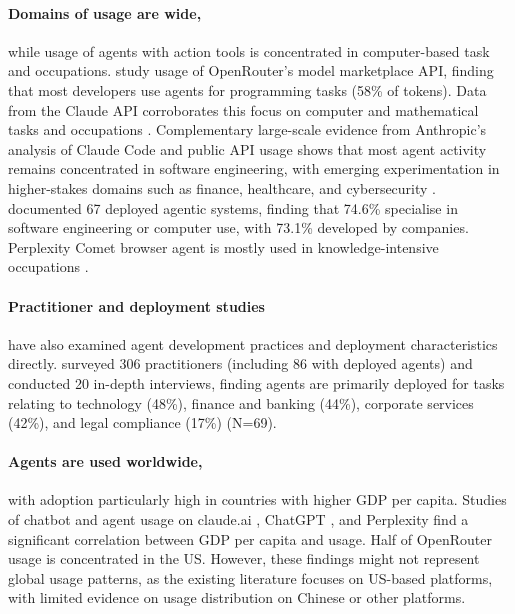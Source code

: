 \documentclass[manuscript,screen,nonacm,oneside]{acmart}
\begin{document}
\paragraph{Domains of usage are wide,} while usage of agents with action tools is concentrated in computer-based task and occupations. \citep{aubakirova2025state} study usage of OpenRouter's model marketplace API, finding that most developers use agents for programming tasks (58\% of tokens). Data from the Claude API corroborates this focus on computer and mathematical tasks and occupations \citep{anthropic2026aeiv4}. Complementary large-scale evidence from Anthropic's analysis of Claude Code and public API usage shows that most agent activity remains concentrated in software engineering, with emerging experimentation in higher-stakes domains such as finance, healthcare, and cybersecurity \citep{anthropic2026agents}. \citep{casper2025agent} documented 67 deployed agentic systems, finding that 74.6\% specialise in software engineering or computer use, with 73.1\% developed by companies. Perplexity Comet browser agent is mostly used in knowledge-intensive occupations \citep{yang2025adoption}.

\paragraph{Practitioner and deployment studies} have also examined agent development practices and deployment characteristics directly. \citep{pan2025measuring} surveyed 306 practitioners (including 86 with deployed agents) and conducted 20 in-depth interviews, finding agents are primarily deployed for tasks relating to technology (48\%), finance and banking (44\%), corporate services (42\%), and legal compliance (17\%) (N=69).

\paragraph{Agents are used worldwide,} with adoption particularly high in countries with higher GDP per capita. Studies of chatbot and agent usage on claude.ai \citep{handa2025which}, ChatGPT \citep{chatterji2025people}, and Perplexity \citep{yang2025adoption} find a significant correlation between GDP per capita and usage. Half of OpenRouter usage \citep{aubakirova2025state} is concentrated in the US. However, these findings might not represent global usage patterns, as the existing literature focuses on US-based platforms, with limited evidence on usage distribution on Chinese or other platforms.
\end{document}
